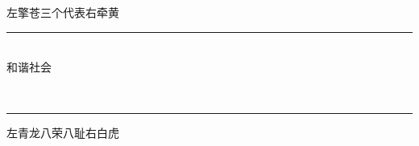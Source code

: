 \noindent 左擎苍\hfill 三个代表\hfill 右牵黄
\hrule
\ \\

\hfill 和谐社会\hfill\

\ \\
\hrule
\noindent 左青龙\hfill 八荣八耻\hfill 右白虎
